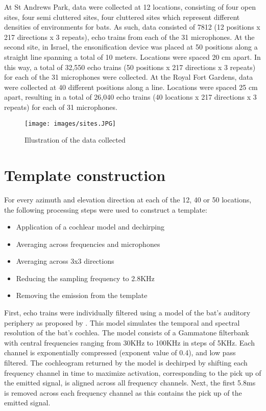 \documentclass[11pt]{report}
\begin{document}
At St Andrews Park, data were collected at 12 locations, consisting of four open sites, four semi cluttered sites, four cluttered sites which represent different densities of environments for bats. As such, data consisted of 7812 (12 positions x 217 directions x 3 repeats), echo trains from each of the 31 microphones. At the second site, in Israel, the ensonification device was placed at 50 positions along a straight line spanning a total of 10 meters. Locations were spaced 20 cm apart. In this way, a total of 32,550 echo trains (50 positions x 217 directions x 3 repeats) for each of the 31 microphones were collected. At the Royal Fort Gardens, data were collected at 40 different positions along a line. Locations were spaced 25 cm apart, resulting in a total of 26,040 echo trains (40 locations x 217 directions x 3 repeats) for each of 31 microphones.

\begin{figure}[ht]
	\texttt{[image: images/sites.JPG]}
	\caption{Illustration of the data collected}
	\label{sites}
\end{figure}

\section{Template construction}

For every azimuth and elevation direction at each of the 12, 40 or 50 locations, the following processing steps were used to construct a template:
\begin{itemize}
    \item Application of a cochlear model and dechirping
    \item Averaging across frequencies and microphones
    \item Averaging across 3x3 directions
    \item Reducing the sampling frequency to 2.8KHz
    \item Removing the emission from the template
\end{itemize}

First, echo trains were individually filtered using a model of the bat's auditory periphery as proposed by \citet{wiegrebe2008autocorrelation}. This model simulates the temporal and spectral resolution of the bat's cochlea. The model consists of a Gammatone filterbank with central frequencies ranging from 30KHz to 100KHz in steps of 5KHz. Each channel is exponentially compressed (exponent value of 0.4), and low pass filtered. The cochleogram returned by the model is dechirped by shifting each frequency channel in time to maximize activation, corresponding to the pick up of the emitted signal, is aligned across all frequency channels. Next, the first 5.8ms is removed across each frequency channel as this contains the pick up of the emitted signal.
\end{document}
